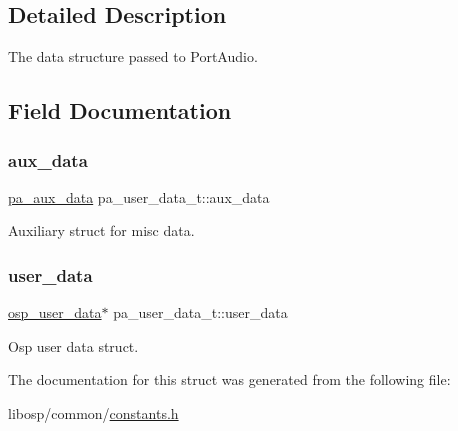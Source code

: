 \subsection{Detailed Description}
The data structure passed to Port\+Audio. 

\subsection{Field Documentation}
\mbox{\label{structpa__user__data__t_a474dfc8856d57bc28146dbb593147c33}} 
\subsubsection{\texorpdfstring{aux\+\_\+data}{aux\_data}}
{\footnotesize\ttfamily \mbox{\hyperlink{constants_8h_add46628e302aedde68d37aea654eda24}{pa\+\_\+aux\+\_\+data}} pa\+\_\+user\+\_\+data\+\_\+t\+::aux\+\_\+data}



Auxiliary struct for misc data. 

\mbox{\label{structpa__user__data__t_afcb50245302828da62e070d923d145c3}} 
\subsubsection{\texorpdfstring{user\+\_\+data}{user\_data}}
{\footnotesize\ttfamily \mbox{\hyperlink{constants_8h_a2d1d78531fe12807c3852488556d5a4b}{osp\+\_\+user\+\_\+data}}$\ast$ pa\+\_\+user\+\_\+data\+\_\+t\+::user\+\_\+data}



Osp user data struct. 



The documentation for this struct was generated from the following file\+:\begin{DoxyCompactItemize}
\item 
libosp/common/\mbox{\hyperlink{constants_8h}{constants.\+h}}\end{DoxyCompactItemize}

